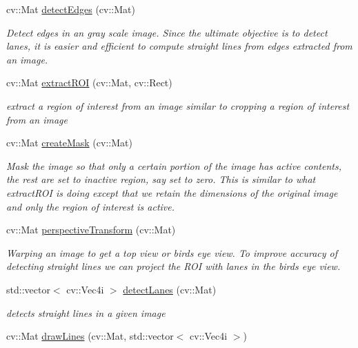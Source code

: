 \begin{DoxyCompactItemize}
cv\+::\+Mat \hyperlink{classlanedetector_a8830dfaa616e20b5e15f8846fa8660eb}{detect\+Edges} (cv\+::\+Mat)
\begin{DoxyCompactList}\small\item\em Detect edges in an gray scale image. Since the ultimate objective is to detect lanes, it is easier and efficient to compute straight lines from edges extracted from an image. \end{DoxyCompactList}\item 
cv\+::\+Mat \hyperlink{classlanedetector_ab82eab5e0a1d126018c99875b2486d5e}{extract\+R\+OI} (cv\+::\+Mat, cv\+::\+Rect)
\begin{DoxyCompactList}\small\item\em extract a region of interest from an image similar to cropping a region of interest from an image \end{DoxyCompactList}\item 
cv\+::\+Mat \hyperlink{classlanedetector_abea27c43dbcf8444f5c2b23dd6e4bb6d}{create\+Mask} (cv\+::\+Mat)
\begin{DoxyCompactList}\small\item\em Mask the image so that only a certain portion of the image has active contents, the rest are set to inactive region, say set to zero. This is similar to what extract\+R\+OI is doing except that we retain the dimensions of the original image and only the region of interest is active. \end{DoxyCompactList}\item 
cv\+::\+Mat \hyperlink{classlanedetector_a6433369cb584d5c247fe1a00569d17d5}{perspective\+Transform} (cv\+::\+Mat)
\begin{DoxyCompactList}\small\item\em Warping an image to get a top view or bird\textquotesingle{}s eye view. To improve accuracy of detecting straight lines we can project the R\+OI with lanes in the bird\textquotesingle{}s eye view. \end{DoxyCompactList}\item 
std\+::vector$<$ cv\+::\+Vec4i $>$ \hyperlink{classlanedetector_a10d588d6b85384ad237e6fbfdf679591}{detect\+Lanes} (cv\+::\+Mat)
\begin{DoxyCompactList}\small\item\em detects straight lines in a given image \end{DoxyCompactList}\item 
cv\+::\+Mat \hyperlink{classlanedetector_a7d7506555f481f184276a4180c200a73}{draw\+Lines} (cv\+::\+Mat, std\+::vector$<$ cv\+::\+Vec4i $>$)

\end{DoxyCompactItemize}
